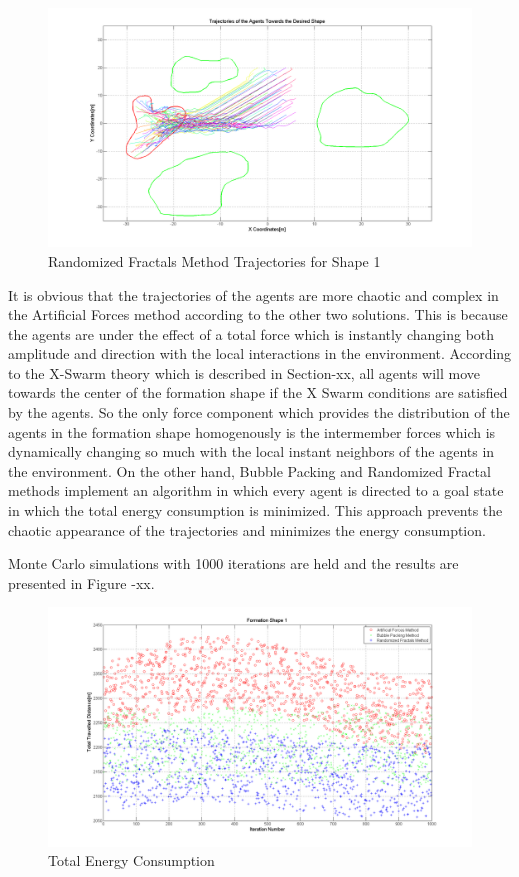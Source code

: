 \begin{figure}[H]
\caption{Randomized Fractals Method Trajectories for Shape 1}
\centerline{\includegraphics[scale = 0.35]{Randomized_Trajectories_1}}
\end{figure} 	
			
It is obvious that the trajectories of the agents are more chaotic and complex in the Artificial Forces method according to the other two solutions. This is because the agents are under the effect of a total force which is instantly changing both amplitude and direction with the local interactions in the environment. According to the X-Swarm theory which is described in Section-xx, all agents will move towards the center of the formation shape if the X Swarm conditions are satisfied by the agents. So the only force component which provides the distribution of the agents in the formation shape homogenously is the intermember forces which is dynamically changing so much with the local instant neighbors of the agents in the environment. On the other hand, Bubble Packing and Randomized Fractal methods implement an algorithm in which every agent is directed to a goal state in which the total energy consumption is minimized. This approach prevents the chaotic appearance of the trajectories and minimizes the energy consumption.

Monte Carlo simulations with 1000 iterations are held and the results are presented in Figure -xx. 
		
\begin{figure}[H]
\caption{Total Energy Consumption}
\centerline{\includegraphics[scale = 0.35]{Total_Energy_Shape_1}}
\end{figure} 	
				
